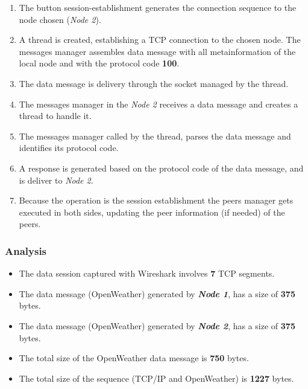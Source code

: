 \begin{enumerate}

\item The button session-establishment generates the connection sequence to the node chosen (\emph{Node 2}).

\item A thread is created, establishing a \gls{TCP} connection to the chosen node. The messages manager assembles data message with all metainformation of the local node and with the protocol code \textbf{100}.

\item The data message is delivery through the socket managed by the thread.

\item The messages manager in the \emph{Node 2} receives a data message and creates a thread to handle it.

\item The messages manager called by the thread, parses the data message and identifies its protocol code.

\item A response is generated based on the protocol code of the data message, and is deliver to \emph{Node 2}.

\item Because the operation is the session establishment the peers manager gets executed in both sides, updating the peer information (if needed) of the peers.
\end{enumerate}


\subsubsection{Analysis}

\begin{itemize}
\item The data session captured with Wireshark involves \textbf{7} \gls{TCP} segments. 
\item The data message (OpenWeather) generated by \textbf{\emph{Node 1}}, has a size of \textbf{375} bytes.
\item The data message (OpenWeather) generated by \textbf{\emph{Node 2}}, has a size of \textbf{375} bytes.
\item The total size of the OpenWeather data message is \textbf{750} bytes.
\item The total size of the sequence (\gls{TCP}/\gls{IP} and OpenWeather) is \textbf{1227} bytes. 
\end{itemize}
 
